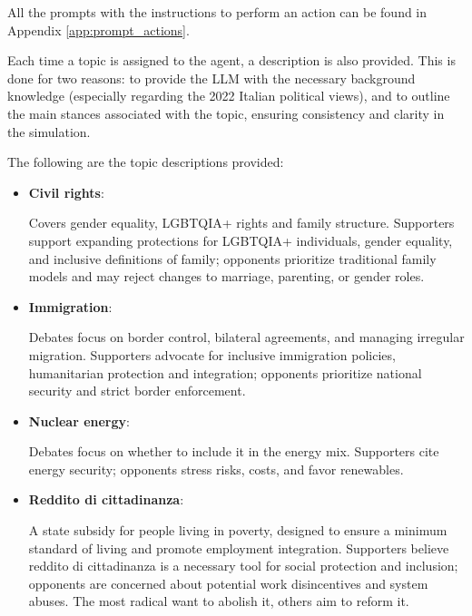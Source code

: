 
All the prompts with the instructions to perform an action can be found in Appendix \ref{app:prompt_actions}.

\medskip
Each time a topic is assigned to the agent, a description is also provided.
This is done for two reasons: to provide the LLM with the necessary background knowledge (especially regarding the 2022 Italian political views), and to outline the main stances associated with the topic, ensuring consistency and clarity in the simulation.

The following are the topic descriptions provided:

\begin{itemize}
    \item \textbf{Civil rights}:
        \begin{tcolorbox}[prompt]
            Covers gender equality, LGBTQIA+ rights and family structure. Supporters support expanding protections for LGBTQIA+ individuals, gender equality, and inclusive definitions of family; opponents prioritize traditional family models and may reject changes to marriage, parenting, or gender roles.
        \end{tcolorbox}

    \item \textbf{Immigration}:
        \begin{tcolorbox}[prompt]
            Debates focus on border control, bilateral agreements, and managing irregular migration. Supporters advocate for inclusive immigration policies, humanitarian protection and integration; opponents prioritize national security and strict border enforcement.
        \end{tcolorbox}

    \item \textbf{Nuclear energy}:
        \begin{tcolorbox}[prompt]
            Debates focus on whether to include it in the energy mix. Supporters cite energy security; opponents stress risks, costs, and favor renewables.
        \end{tcolorbox}

    \item \textbf{Reddito di cittadinanza}:
        \begin{tcolorbox}[prompt]
            A state subsidy for people living in poverty, designed to ensure a minimum standard of living and promote employment integration. Supporters believe reddito di cittadinanza is a necessary tool for social protection and inclusion; opponents are concerned about potential work disincentives and system abuses. The most radical want to abolish it, others aim to reform it.
        \end{tcolorbox}    
\end{itemize}

